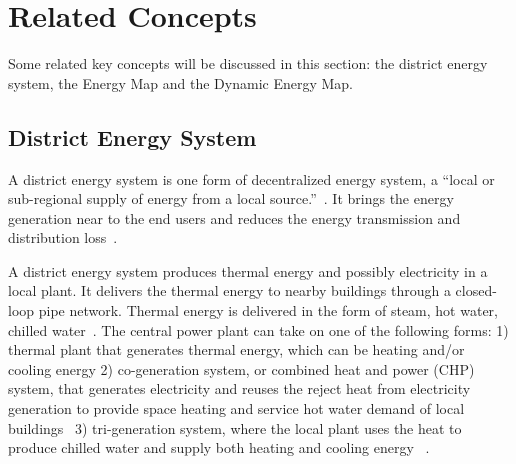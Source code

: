 \section{Related Concepts}\label{concept}
Some related key concepts will be discussed in this section: the
district energy system, the Energy Map and the Dynamic Energy Map.

\subsection{District Energy System}
A district energy system is one form of decentralized energy system, a
``local or sub-regional supply of energy from a local
source.''~\cite{lhmreport2012}. It brings the energy generation near
to the end users and reduces the energy transmission and
distribution loss~\cite{decentralHeatMap2011}.

A district energy system produces thermal energy and possibly
electricity in a local plant. It delivers the thermal energy to nearby
buildings through a closed-loop pipe network. Thermal energy is
delivered in the form of steam, hot water, chilled
water~\cite{baird2014}. The central power plant can take on one of the
following forms: 1) thermal plant that generates thermal energy, which
can be heating and/or cooling energy 2) co-generation system, or
combined heat and power (CHP) system, that generates electricity and
reuses the reject heat from electricity generation to provide space
heating and service hot water demand of local
buildings~\cite{IDEA2005} 3) tri-generation system, where the local
plant uses the heat to produce chilled water
and supply both heating and cooling energy ~\cite{cchp2015}.

